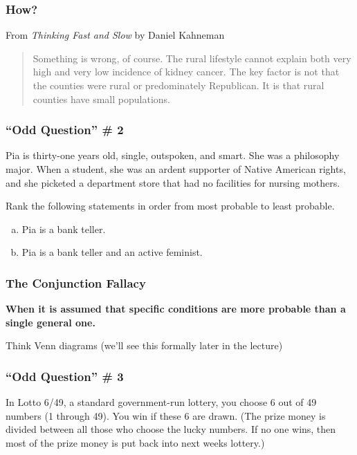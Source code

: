 \documentclass{beamer}
\begin{document}
\begin{singlespace}
\begin{frame}
\frametitle{How?}
From \textit{Thinking Fast and Slow} by Daniel Kahneman
    \begin{quote}
        Something is wrong, of course. The rural lifestyle cannot explain both very high and very low 
        incidence of kidney cancer. The key factor is not that the counties were rural or predominately 
        Republican. \alert{It is that rural counties have small populations.}
    \end{quote}
\end{frame}

\begin{frame}
\frametitle{``Odd Question'' \# 2}
	Pia is thirty-one years old, single, outspoken, and smart. She was a philosophy major. When a 
	student, she was an ardent supporter of Native American rights, and she picketed a department 
	store that had no facilities for nursing mothers. 

    \vspace{1em}
    Rank the following statements in order from most probable to least probable.
	\begin{enumerate}[(a)]
		\item Pia is a bank teller.
		\item Pia is a bank teller and an active feminist.
	\end{enumerate}
\end{frame}

\begin{frame}
\frametitle{The Conjunction Fallacy}
    \textbf{When it is assumed that specific conditions are more probable than a single general one.}

    Think Venn diagrams (we'll see this formally later in the lecture)
\end{frame}

\begin{frame}
\frametitle{``Odd Question'' \# 3}
	In Lotto 6/49, a standard government-run lottery, you choose 6 out of 49 numbers (1 through 49). 
	You win if these 6 are drawn. (The prize money is divided between all those who choose the lucky 
	numbers. If no one wins, then most of the prize money is put back into next weeks lottery.)
	

\end{frame}
\end{singlespace}
\end{document}
